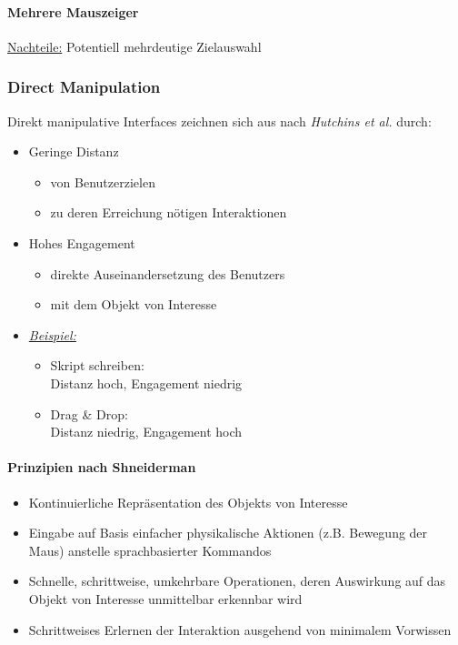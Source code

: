 \documentclass
[
	8pt,		%
	ngerman,	%
	a4paper,	%
	landscape,	%
	final		%
]{extarticle}
\newcommand{\example}{\textit{\underline{Beispiel:} }}
\begin{document}
\begin{multicols*}{4}
	\paragraph{Mehrere Mauszeiger} \underline{Nachteile:} Potentiell mehrdeutige
	Zielauswahl
	\subsubsection{Direct Manipulation}
	Direkt manipulative Interfaces zeichnen sich aus nach \emph{Hutchins et al.}
	durch:
	\begin{itemize}
		\item Geringe Distanz
		      \begin{itemize}[nolistsep]
			      \item von Benutzerzielen
			      \item zu deren Erreichung nötigen Interaktionen
		      \end{itemize}
		\item Hohes Engagement
		      \begin{itemize}[nolistsep]
			      \item direkte Auseinandersetzung des Benutzers
			      \item mit dem Objekt von Interesse
		      \end{itemize}
		\item \example
		      \begin{itemize}[nolistsep]
			      \item Skript schreiben:\\ Distanz hoch, Engagement niedrig
			      \item Drag \& Drop:\\ Distanz niedrig, Engagement hoch
		      \end{itemize}
	\end{itemize}
	\paragraph{Prinzipien nach Shneiderman}
	\begin{itemize}
		\item Kontinuierliche Repräsentation des Objekts von Interesse
		\item Eingabe auf Basis einfacher physikalische Aktionen
		      (z.B. Bewegung der Maus) anstelle sprachbasierter Kommandos
		\item Schnelle, schrittweise, umkehrbare Operationen, deren Auswirkung
		      auf das Objekt von Interesse unmittelbar erkennbar wird
		\item Schrittweises Erlernen der Interaktion ausgehend von minimalem
		      Vorwissen
	\end{itemize}

\end{multicols*}
\end{document}
